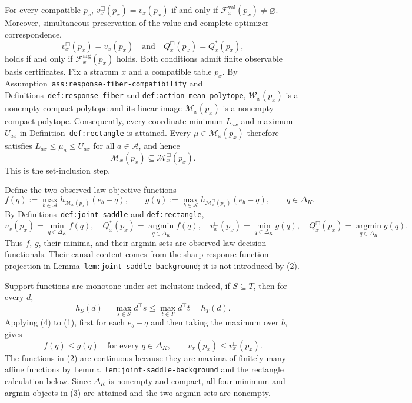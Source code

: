 For every compatible \(p_x\), \(v_x^{\Box}(p_x)=v_x(p_x)\) if and only if \(\mathcal F_x^{\mathrm{val}}(p_x)\neq\varnothing\).  Moreover, simultaneous preservation of the value and complete optimizer correspondence,
\[
 v_x^{\Box}(p_x)=v_x(p_x)\quad\text{and}\quad Q_x^{\Box}(p_x)=Q_x^*(p_x),
\]
holds if and only if \(\mathcal F_x^{\mathrm{arg}}(p_x)\) holds.  Both conditions admit finite observable basis certificates.
Fix a stratum \(x\) and a compatible table \(p_x\).  By Assumption~\texttt{ass:response-fiber-compatibility} and Definitions~\texttt{def:response-fiber} and \texttt{def:action-mean-polytope}, \(\mathcal W_x(p_x)\) is a nonempty compact polytope and its linear image \(\mathcal M_x(p_x)\) is a nonempty compact polytope.  Consequently, every coordinate minimum \(L_{ax}\) and maximum \(U_{ax}\) in Definition~\texttt{def:rectangle} is attained.  Every \(\mu\in\mathcal M_x(p_x)\) therefore satisfies \(L_{ax}\leq\mu_a\leq U_{ax}\) for all \(a\in\mathcal A\), and hence
\[
 \mathcal M_x(p_x)\subseteq\mathcal M_x^{\Box}(p_x).
\tag{1}
\]
This is the set-inclusion step.

Define the two observed-law objective functions
\[
 f(q):=\max_{b\in\mathcal A}h_{\mathcal M_x(p_x)}(e_b-q),
 \qquad
 g(q):=\max_{b\in\mathcal A}h_{\mathcal M_x^{\Box}(p_x)}(e_b-q),
 \qquad q\in\Delta_K.
\tag{2}
\]
By Definitions~\texttt{def:joint-saddle} and \texttt{def:rectangle},
\[
 v_x(p_x)=\min_{q\in\Delta_K}f(q),\quad
 Q_x^*(p_x)=\operatorname*{argmin}_{q\in\Delta_K}f(q),
\quad
 v_x^{\Box}(p_x)=\min_{q\in\Delta_K}g(q),\quad
 Q_x^{\Box}(p_x)=\operatorname*{argmin}_{q\in\Delta_K}g(q).
\tag{3}
\]
Thus \(f\), \(g\), their minima, and their argmin sets are observed-law decision functionals.  Their causal content comes from the sharp response-function projection in Lemma~\texttt{lem:joint-saddle-background}; it is not introduced by (2).

Support functions are monotone under set inclusion: indeed, if \(S\subseteq T\), then for every \(d\),
\[
 h_S(d)=\max_{s\in S}d^\top s\leq\max_{t\in T}d^\top t=h_T(d).
\tag{4}
\]
Applying (4) to (1), first for each \(e_b-q\) and then taking the maximum over \(b\), gives
\[
 f(q)\leq g(q)\quad\text{for every }q\in\Delta_K,
 \qquad
 v_x(p_x)\leq v_x^{\Box}(p_x).
\tag{5}
\]
The functions in (2) are continuous because they are maxima of finitely many affine functions by Lemma~\texttt{lem:joint-saddle-background} and the rectangle calculation below.  Since \(\Delta_K\) is nonempty and compact, all four minimum and argmin objects in (3) are attained and the two argmin sets are nonempty.

